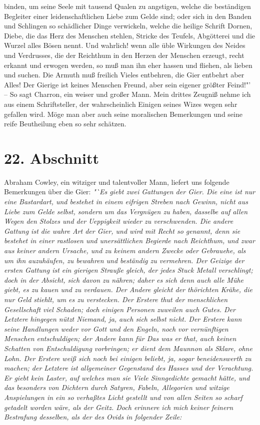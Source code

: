 {binden, um seine Seele mit tausend Qualen zu angstigen, welche die beständigen
Begleiter einer leidenschaftlichen Liebe zum Gelde sind; oder sich in den Banden
und Schlingen so schädlicher Dinge verwickeln, welche die heilige Schrift
Dornen, Diebe, die das Herz des Menschen stehlen, Stricke des Teufels,
Abgötterei und die Wurzel alles Bösen nennt. Und wahrlich! wenn alle üble
Wirkungen des Neides und Verdrusses, die der Reichthum in den Herzen der
Menschen erzeugt, recht erkannt und erwogen werden, so muß man ihn eher hassen
und fliehen, als lieben und suchen. Die Armuth muß freilich Vieles entbehren,
die Gier entbehrt aber Alles! Der Gierige ist keines Menschen Freund, aber sein
eigener größter Feind!"'} -- So sagt Charron, ein weiser und großer Mann. Mein
drittes Zeugniß nehme ich aus einem Schriftsteller, der wahrscheinlich Einigen
seines Wizes wegen sehr gefallen wird. Möge man aber auch seine moralischen
Bemerkungen und seine reife Beutheilung eben so sehr schätzen.

\section{22. Abschnitt} \label{kap13_ab22} 

Abraham Cowley, ein witziger und talentvoller Mann, liefert uns folgende
Bemerkungen über die Gier:
\textit{"`Es giebt zwei Gattungen der Gier. Die eine ist
nur eine Bastardart, und bestehet in einem eifrigen Streben nach Gewinn, nicht
aus Liebe zum Gelde selbst, sondern um das Vergnügen zu haben, dasselbe auf
allen Wegen den Stolzes und der Ueppigkeit wieder zu verschwenden. Die andere
Gattung ist die wahre Art der Gier, und wird mit Recht so genannt, denn sie
bestehet in einer rastlosen und unersättlichen Begierde nach Reichthum, und zwar
aus keiner andern Ursache, und zu keinem andern Zwecke oder Gebrauehe, als um
ihn auzuhäufen, zu bewahren und beständig zu vermehren. Der Geizige der ersten
Gattung ist ein gierigen Strauße gleich, der jedes Stuck Metall verschlingt;
doch in der Absicht, sich davon zu nähren; daher es sich denn auch alle Mühe
giebt, es zu kauen und zu verdauen. Der Andere gleicht der thörichten Krähe, die
nur Geld stiehlt, um es zu verstecken.  Der Erstere thut der menschlichen
Gesellschaft viel Schaden; doch einigen Personen zuweilen auch Gutes. Der
Letztere hingegen nützt Niemand, ja, auch sich selbst nicht. Der Erstere kann
seine Handlungen weder vor Gott und den Engeln, noch vor vernünftigen Menschen
entschuldigen; der Andere kann für Das was er that, auch keinen Schatten von
Entschuldigung vorbringen; er dient dem Maunnon als Sklare, ohne Lohn. Der
Erstere weiß sich noch bei einigen beliebt, ja, sogar beneidenswerth zu machen;
der Letztere ist allgemeiner Gegenstand des Hasses und der Verachtung. Er giebt
kein Laster, auf welches man sie Viele Sinngedichte gemacht hätte, und das
besonders von Dichtern durch Satyren, Fabeln, Allegorien und witzige
Anspielungen in ein so verhaßtes Licht gestellt und von allen Seiten so scharf
getadelt worden wäre, als der Geitz. Doch erinnere ich mich keiner feinern
Bestrafung desselben, als der des Ovids in folgender Zeile:}


